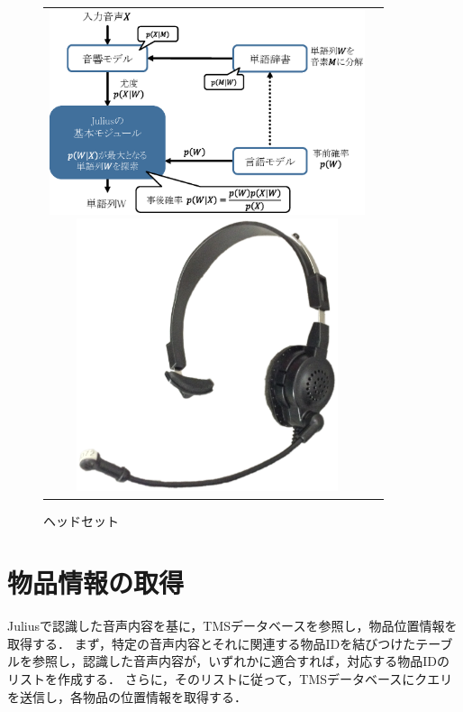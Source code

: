 \begin{figure}[htbp]
\begin{tabular}{cc}
%
  \begin{minipage}{0.55\textwidth}
    \begin{center}
      \includegraphics[height=60mm]{figure/julius.eps}
      \vspace{-10mm}
      \caption{juliusの認識プロセス}
      \label{fig:julius}
    \end{center}
  \end{minipage}
%
  \begin{minipage}{0.4\textwidth}
    \begin{center}
      \includegraphics[height=80mm]{figure/headset.eps}
      \vspace{-20mm}
      \caption{ヘッドセット}
      \label{fig:headset}
    \end{center}
  \end{minipage}
%
\end{tabular}
\end{figure}

\section{物品情報の取得}
Juliusで認識した音声内容を基に，TMSデータベースを参照し，物品位置情報を取得する．
まず，特定の音声内容とそれに関連する物品IDを結びつけたテーブルを参照し，認識した音声内容が，いずれかに適合すれば，対応する物品IDのリストを作成する．
さらに，そのリストに従って，TMSデータベースにクエリを送信し，各物品の位置情報を取得する．

